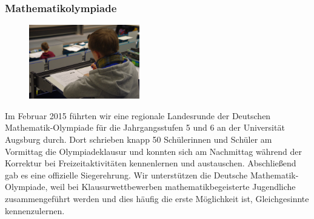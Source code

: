\documentclass[12pt]{zettel}
\begin{document}
\subsubsection*{Mathematikolympiade}

\begin{figure}
  \vspace{-4.6em}
  \raggedleft
     \includegraphics[width=0.43\textwidth]{impressionen/klausur}
  \vspace{-1em}
\end{figure}


Im Februar 2015 führten wir eine regionale Landesrunde der Deutschen Mathematik-Olympiade für die Jahrgangsstufen 5 und 6 an der Universität Augsburg durch. Dort schrieben knapp 50  Schülerinnen und Schüler am Vormittag die Olympiadeklausur und konnten sich am Nachmittag während der Korrektur bei Freizeitaktivitäten kennenlernen und austauschen. Abschließend gab es eine offizielle Siegerehrung. Wir unterstützen die Deutsche Mathematik-Olympiade, weil bei Klausurwettbewerben mathematikbegeisterte Jugendliche zusammengeführt werden und dies häufig die erste Möglichkeit ist, Gleichgesinnte kennenzulernen.
\end{document}
